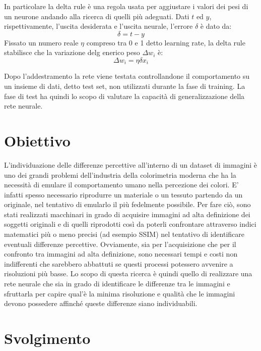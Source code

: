 \documentclass[a4paper,11pt]{article}
\begin{document}
    In particolare la delta rule è una regola usata per aggiustare i valori dei pesi di un neurone andando alla ricerca di quelli più adeguati.
    Dati $t$ ed $y$, rispettivamente, l'uscita desiderata e l'uscita neurale, l'errore $\delta$ è dato da:
    $$ \delta = t-y $$
    Fissato un numero reale $\eta$ compreso tra 0 e 1 detto learning rate, la delta rule stabilisce che la variazione delg enerico peso $\Delta w_i$ è:
    $$ \Delta w_i = \eta \delta x_i $$

    Dopo l’addestramento la rete viene testata controllandone il comportamento su un insieme di dati, detto test set, non utilizzati durante la fase di training. La fase di test ha quindi lo scopo 
    di valutare la capacità di generalizzazione della rete neurale.
    \newpage

    \section{Obiettivo}
    L'individuazione delle differenze percettive all'interno di un dataset di immagini è uno dei grandi problemi dell'industria della colorimetria moderna che ha la necessità di emulare il 
    comportamento umano nella percezione dei colori. E' infatti spesso necessario riprodurre un materiale o un tessuto partendo da un originale, nel tentativo di emularlo il più fedelmente possibile. 
    Per fare ciò, sono stati realizzati macchinari in grado di acquisire immagini ad alta definizione dei soggetti originali e di quelli riprodotti così da poterli confrontare attraverso indici matematici più o meno precisi (ad esempio SSIM) 
    nel tentativo di identificare eventuali differenze percettive. Ovviamente, sia per l'acquisizione che per il confronto tra immagini ad alta definizione, sono necessari tempi e costi non indifferenti che sarebbero abbattuti se questi processi potessero avvenire a risoluzioni più basse.
    Lo scopo di questa ricerca è quindi quello di realizzare una rete neurale che sia in grado di identificare le differenze tra le immagini e sfruttarla per capire qual'è la minima risoluzione e qualità che le immagini devono possedere affinché queste differenze siano individuabili.

    \newpage

    \section{Svolgimento}
\end{document}
